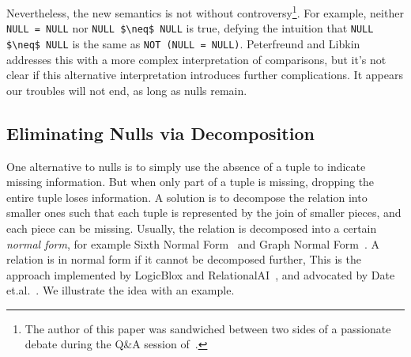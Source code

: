 \documentclass[sigconf,nonacm]{acmart}
\begin{document}
Nevertheless, the new semantics is not without 
 controversy\footnote{The author of this paper was sandwiched between two sides of 
 a passionate debate during the Q\&A session of~\cite{DBLP:conf/pods/LibkinP23}.}.
For example, neither \lstinline|NULL = NULL| nor \lstinline|NULL $\neq$ NULL|
 is true, defying the intuition that \lstinline|NULL $\neq$ NULL|
 is the same as \lstinline|NOT (NULL = NULL)|.
Peterfreund and Libkin addresses this with
 a more complex interpretation of comparisons,
 but it's not clear if this alternative interpretation
 introduces further complications.
It appears our troubles will not end, 
 as long as nulls remain.

\subsection{Eliminating Nulls via Decomposition}
One alternative to nulls is to simply
 use the absence of a tuple to indicate missing information.
But when only part of a tuple is missing, 
 dropping the entire tuple loses information.
A solution is to decompose the relation into smaller ones
 such that each tuple is represented by the join 
 of smaller pieces, and each piece can be missing.
Usually, the relation is decomposed into a certain 
 {\em normal form}, 
 for example Sixth Normal Form~\cite{DBLP:books/daglib/0014409}
 and Graph Normal Form~\cite{RAIDocumentation}.
A relation is in normal form if it cannot be decomposed further,
This is the approach implemented by LogicBlox 
 and RelationalAI~\cite{RAIDocumentation,DBLP:conf/sigmod/ArefCGKOPVW15},
 and advocated by Date et.al.~\cite{DBLP:journals/sigmod/Date08,DBLP:books/daglib/0014409}.
We illustrate the idea with an example.

\end{document}
